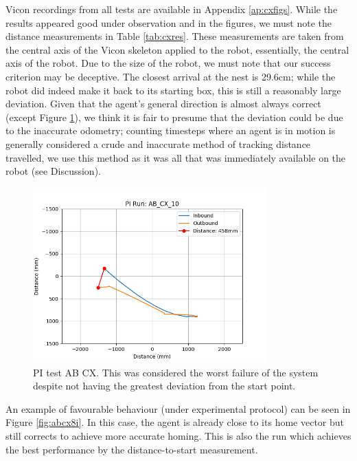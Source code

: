 \documentclass[a4paper,11pt,twoside,openright]{article}
\begin{document}
Vicon recordings from all tests are available in Appendix
\ref{ap:cxfigs}. While the results appeared good under observation and
in the figures, we must note the distance measurements in Table
\ref{tab:cxres}. These measurements are taken from the central axis of
the Vicon skeleton applied to the robot, essentially, the central axis
of the robot. Due to the size of the robot, we must note that our
success criterion may be deceptive. The closest arrival at the nest is
29.6cm; while the robot did indeed make it back to its starting box,
this is still a reasonably large deviation. Given that the agent's
general direction is almost always correct (except Figure
\ref{fig:abcx10i}), we think it is fair to presume that the deviation
could be due to the inaccurate odometry; counting timesteps where an
agent is in motion is generally considered a crude and inaccurate
method of tracking distance travelled, we use this method as it was
all that was immediately available on the robot (see Discussion).
\newline\par

\begin{figure}[h!]
  \centering
  \includegraphics[width=0.8\textwidth]{AB_CX_10}
  \caption{\label{fig:abcx10i} PI test AB\textunderscore
    CX. This was considered the worst failure of the
  system despite not having the greatest deviation from the start point.}
\end{figure}

An example of favourable behaviour (under experimental protocol) can
be seen in Figure \ref{fig:abcx8i}. In this case, the agent is already
close to its home vector but still corrects to achieve more accurate
homing. This is also the run which achieves the best performance by
the distance-to-start measurement.
\newline\par
\end{document}

